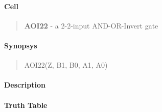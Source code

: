 \label{AOI22}
\paragraph{Cell}
\begin{quote}
    \textbf{AOI22} - a 2-2-input AND-OR-Invert gate
\end{quote}

\paragraph{Synopsys}
\begin{quote}
    AOI22(Z, B1, B0, A1, A0)
\end{quote}

\paragraph{Description}



\paragraph{Truth Table}


